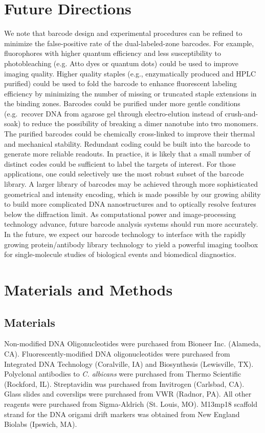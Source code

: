 \section{Future Directions}
We note that  barcode design and experimental procedures can be refined to 
 minimize the false-positive rate of the dual-labeled-zone barcodes. For example, 
fluorophores with higher quantum efficiency and less susceptibility to photobleaching 
(e.g. Atto dyes or quantum dots) could be used to improve imaging quality. Higher 
quality staples (e.g., enzymatically produced and HPLC purified) could be used to fold 
the barcode to enhance fluorescent labeling efficiency by minimizing the number of 
missing or truncated staple extensions in the binding zones. Barcodes could be purified 
under more gentle conditions (e.g.~recover DNA from agarose gel through electro-elution \citep{bellot_recovery_2011} instead of crush-and-soak) to reduce the possibility of breaking a dimer 
nanotube into two monomers. The purified barcodes could be chemically cross-linked \citep{rajendran_photo-cross-linking-assisted_2011}
to improve their thermal and mechanical stability. Redundant coding could be built into 
the barcode to generate more reliable readouts. In practice, it is likely that a small number 
of distinct codes could be sufficient to label the targets of interest. For those 
applications, one could selectively use the most robust subset of the barcode library. A 
larger library of barcodes may be achieved through more sophisticated geometrical and 
intensity encoding, which is made possible by our growing ability to build more 
complicated DNA nanostructures and to optically resolve features below the diffraction 
limit. As computational power and image-processing technology 
advance, future barcode analysis systems should run more accurately. In the future, we 
expect our barcode technology to interface with the rapidly growing protein/antibody 
library technology to yield a powerful imaging toolbox for single-molecule studies of 
biological events and biomedical diagnostics. 


\section{Materials and Methods}
\subsection{Materials}
Non-modified DNA Oligonucleotides were purchased from Bioneer Inc. (Alameda, CA). Fluorescently-modified DNA oligonucleotides were purchased from Integrated DNA Technology (Coralville, IA) and Biosynthesis (Lewisville, TX). Polyclonal antibodies to \textit{C. albicans} were purchased from Thermo Scientific (Rockford, IL). Streptavidin was purchased from Invitrogen (Carlsbad, CA). Glass slides and coverslips were purchased from VWR (Radnor, PA). All other reagents were purchased from Sigma-Aldrich (St. Louis, MO). M13mp18 scaffold strand for the DNA origami drift markers was obtained from New England Biolabs (Ipswich, MA).

